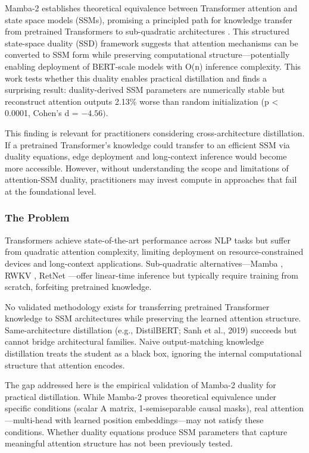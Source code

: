 
Mamba-2 establishes theoretical equivalence between Transformer attention and state space models (SSMs), promising a principled path for knowledge transfer from pretrained Transformers to sub-quadratic architectures \citep{dao2024mamba2}. This structured state-space duality (SSD) framework suggests that attention mechanisms can be converted to SSM form while preserving computational structure---potentially enabling deployment of BERT-scale models with O(n) inference complexity. This work tests whether this duality enables practical distillation and finds a surprising result: duality-derived SSM parameters are numerically stable but reconstruct attention outputs 2.13\% worse than random initialization (p < 0.0001, Cohen's d = $-4.56)$.

This finding is relevant for practitioners considering cross-architecture distillation. If a pretrained Transformer's knowledge could transfer to an efficient SSM via duality equations, edge deployment and long-context inference would become more accessible. However, without understanding the scope and limitations of attention-SSM duality, practitioners may invest compute in approaches that fail at the foundational level.

\subsubsection{The Problem}

Transformers achieve state-of-the-art performance across NLP tasks but suffer from quadratic attention complexity, limiting deployment on resource-constrained devices and long-context applications. Sub-quadratic alternatives---Mamba \citep{gu2023mamba}, RWKV \citep{peng2023rwkv}, RetNet \citep{sun2023retnet}---offer linear-time inference but typically require training from scratch, forfeiting pretrained knowledge.

No validated methodology exists for transferring pretrained Transformer knowledge to SSM architectures while preserving the learned attention structure. Same-architecture distillation (e.g., DistilBERT; Sanh et al., 2019) succeeds but cannot bridge architectural families. Naive output-matching knowledge distillation treats the student as a black box, ignoring the internal computational structure that attention encodes.

The gap addressed here is the empirical validation of Mamba-2 duality for practical distillation. While Mamba-2 proves theoretical equivalence under specific conditions (scalar A matrix, 1-semiseparable causal masks), real attention---multi-head with learned position embeddings---may not satisfy these conditions. Whether duality equations produce SSM parameters that capture meaningful attention structure has not been previously tested.

